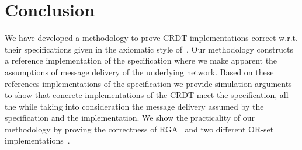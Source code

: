 \section{Conclusion}
\label{sec:conclusion}

We have developed a methodology to prove CRDT implementations correct
w.r.t. their specifications given in the axiomatic style
of~\cite{Burckhardt:2014}.
%
Our methodology constructs a reference implementation of the
specification where we make apparent the assumptions of message
delivery of the underlying network. 
% 
Based on these references implementations of the specification we
provide simulation arguments to show that concrete implementations of
the CRDT meet the specification, all the while taking into
consideration the message delivery assumed by the specification and
the implementation.
%
We show the practicality of our methodology by proving the correctness
of RGA~\cite{RohJKL11} and two different OR-set
implementations~\cite{Shapiro:2011,Bieniusa:2012}.


